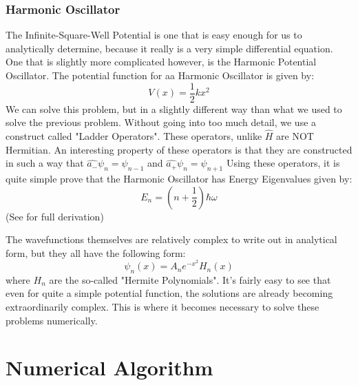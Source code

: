 \documentclass[11pt]{article} %
\begin{document}
\subsubsection{Harmonic Oscillator}
The Infinite-Square-Well Potential is one that is easy enough for us to analytically determine, because it really is a very simple differential equation. One that is slightly more complicated however, is the Harmonic Potential Oscillator. The potential function for aa Harmonic Oscillator is given by:
\begin{equation}
V(x) = \frac{1}{2}kx^2
\end{equation}
We can solve this problem, but in a slightly different way than what we used to solve the previous problem. Without going into too much detail, we use a construct called "Ladder Operators". These operators, unlike $\hat{H}$ are NOT Hermitian. An interesting property of these operators is that they are constructed in such a way that $\hat{a_-}\psi_n = \psi_{n-1}$ and $\hat{a_+}\psi_n = \psi_{n+1}$  Using these operators, it is quite simple prove that the Harmonic Oscillator has Energy Eigenvalues given by:
\begin{equation}
E_n = (n+\frac{1}{2})\hbar \omega
\end{equation}
(See \cite{BU} for full derivation)
\\
\par The wavefunctions themselves are relatively complex to write out in analytical form, but they all have the following form:
\begin{equation}
\psi _n(x) = A_n e^{-x^2} H_n(x)
\end{equation}
where $H_n$ are the so-called "Hermite Polynomials". It's fairly easy to see that even for quite a simple potential function, the solutions are already becoming extraordinarily complex. This is where it becomes necessary to solve these problems numerically.
\section{Numerical Algorithm}
\end{document}
